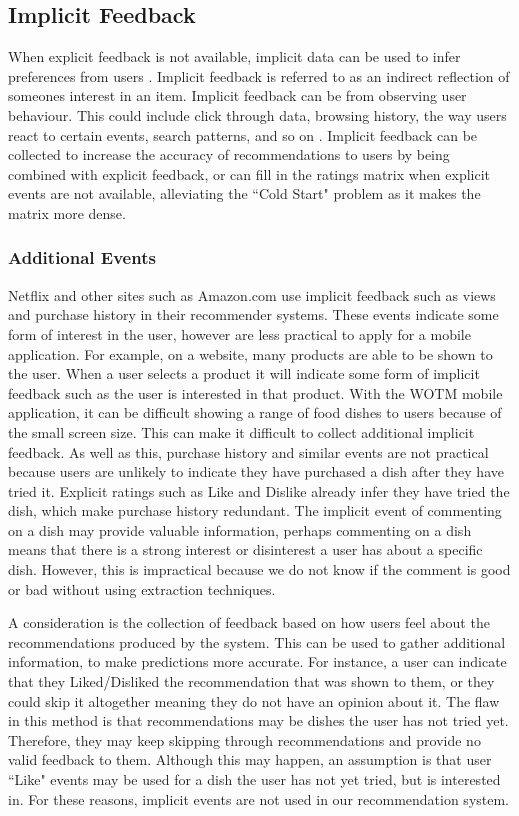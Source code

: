 \subsection{Implicit Feedback}

When explicit feedback is not available, implicit data can be used to infer preferences from users \cite{koren2009matrix}. Implicit feedback is referred to as an indirect reflection of someones interest in an item. Implicit feedback can be from observing user behaviour. This could include click through data, browsing history, the way users react to certain events, search patterns, and so on \cite{koren2009matrix}. Implicit feedback can be collected to increase the accuracy of recommendations to users by being combined with explicit feedback, or can fill in the ratings matrix when explicit events are not available, alleviating the ``Cold Start" problem as it makes the matrix more dense. 

\subsubsection{Additional Events}

Netflix \cite{koren2009matrix} and other sites such as Amazon.com \cite{schafer2007collaborative} use implicit feedback such as views and purchase history in their recommender systems. These events indicate some form of interest in the user, however are less practical to apply for a mobile application. For example, on a website, many products are able to be shown to the user. When a user selects a product it will indicate some form of implicit feedback such as the user is interested in that product. With the WOTM mobile application, it can be difficult showing a range of food dishes to users because of the small screen size. This can make it difficult to collect additional implicit feedback. As well as this, purchase history and similar events are not practical because users are unlikely to indicate they have purchased a dish after they have tried it. Explicit ratings such as Like and Dislike already infer they have tried the dish, which make purchase history redundant. The implicit event of commenting on a dish may provide valuable information, perhaps commenting on a dish means that there is a strong interest or disinterest a user has about a specific dish. However, this is impractical because we do not know if the comment is good or bad without using extraction techniques.

A consideration is the collection of feedback based on how users feel about the recommendations produced by the system. This can be used to gather additional information, to make predictions more accurate. For instance, a user can indicate that they Liked/Disliked the recommendation that was shown to them, or they could skip it altogether meaning they do not have an opinion about it. The flaw in this method is that recommendations may be dishes the user has not tried yet. Therefore, they may keep skipping through recommendations and provide no valid feedback to them. Although this may happen, an assumption is that user ``Like" events may be used for a dish the user has not yet tried, but is interested in. For these reasons, implicit events are not used in our recommendation system.

